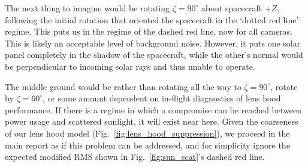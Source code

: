 The next thing to imagine would be rotating $\zeta=90^\circ$ about spacecraft 
$+Z$, 
following the initial rotation that oriented the spacecraft in the `dotted red 
line' regime.
This puts us in the regime of the dashed red line, now for all cameras.
This is likely an acceptable level of background noise.
However, it puts one solar panel completely in the shadow of the spacecraft, 
while the other's normal would be perpendicular to incoming solar rays and thus 
unable to operate.

The middle ground would be rather than rotating all the way to 
$\zeta=90^\circ$, rotate by $\zeta = 60^\circ$, or some amount dependent on 
in-flight diagnostics of \tesss lens hood performance.
If there is a regime in which a  compromise can be reached between
power usage and scattered sunlight, it will exist near here.
Given the coarseness of our lens hood model 
(Fig.~\ref{fig:lens_hood_suppression}), we proceed in the main report as if
this problem can be addressed, and for simplicity ignore the expected
modified RMS shown in Fig.~\ref{fig:sun_scat}'s dashed red line.

 

